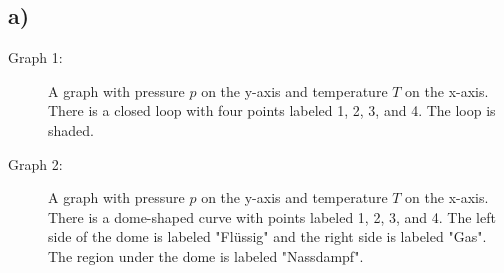 

\subsection*{a)}
\begin{description}
    \item[Graph 1:] A graph with pressure \( p \) on the y-axis and temperature \( T \) on the x-axis. There is a closed loop with four points labeled 1, 2, 3, and 4. The loop is shaded.
    \item[Graph 2:] A graph with pressure \( p \) on the y-axis and temperature \( T \) on the x-axis. There is a dome-shaped curve with points labeled 1, 2, 3, and 4. The left side of the dome is labeled "Flüssig" and the right side is labeled "Gas". The region under the dome is labeled "Nassdampf".
\end{description}